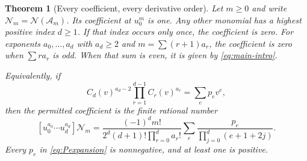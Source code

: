 \documentclass[11pt,letterpaper]{article}
\numberwithin{equation}{section}
\theoremstyle{plain}
\newtheorem{theorem}{Theorem}[section]
\theoremstyle{definition}
\theoremstyle{remark}
\newcommand{\Ac}{\mathcal A}\newcommand{\Nc}{\mathcal N}\newcommand{\Hc}{\mathcal H}
\begin{document}
\begin{theorem}[Every coefficient, every derivative order]\label{thm:universal}
Let $m\ge0$ and write $\Nc_m=\Nc(\Ac_m)$. Its coefficient at $u_0^m$ is one. Any other monomial has a highest positive index $d\ge1$. If that index occurs only once, the coefficient is zero. For exponents $a_0,\ldots,a_d$ with $a_d\ge2$ and $m=\sum(r+1)a_r$, the coefficient is zero when $\sum r a_r$ is odd. When that sum is even, it is given by \eqref{eq:main-intro}.

Equivalently, if
\begin{equation}\label{eq:Pexpansion}
 C_d(v)^{a_d-2}\prod_{r=1}^{d-1}C_r(v)^{a_r}
 =\sum_e p_e v^e,
\end{equation}
then the permitted coefficient is the finite rational number
\begin{equation}\label{eq:positive-beta}
 \boxed{\displaystyle
 [u_0^{a_0}\cdots u_d^{a_d}]\Nc_m
 =\frac{(-1)^d m!}{2^d(d+1)!\prod_{r=0}^d a_r!}
       \sum_e\frac{p_e}{\prod_{j=0}^d(e+1+2j)}.}
\end{equation}
Every $p_e$ in \eqref{eq:Pexpansion} is nonnegative, and at least one is positive.
\end{theorem}
\end{document}
